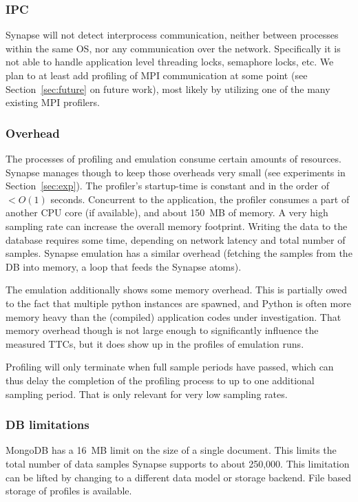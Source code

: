 \documentclass[10pt, conference, compsocconf]{IEEEtran}
\newcommand{\synapse}{Synapse\xspace}
\begin{document}
 \subsubsection{IPC}  \synapse will not detect interprocess
 communication, neither between processes within the same OS, nor any
 communication over the network.  Specifically it is not able to
 handle application level threading locks, semaphore locks, etc.  We
 plan to at least add profiling of MPI communication at some point (see
 Section~\ref{sec:future} on future work), most likely by utilizing
 one of the many existing MPI profilers.

 \subsubsection{Overhead}  The processes of profiling and emulation
 consume certain amounts of resources.  \synapse manages though to
 keep those overheads very small (see experiments in
 Section~\ref{sec:exp}).
 The profiler's startup-time is
 constant and in the order of $<O(1)$ seconds.  Concurrent to the
 application, the profiler consumes a part of another CPU core (if
 available), and about 150~MB of memory.  A very high sampling rate
 can increase the overall memory footprint.  Writing the data to
 the database requires some time, depending on network latency and
 total number of samples.
 \synapse emulation has a similar overhead (fetching the samples from
 the DB into memory, a loop that feeds the \synapse atoms).  

 The emulation additionally shows some memory overhead.  This is
 partially owed to the fact that multiple python instances are
 spawned, and Python is often more memory heavy than the (compiled)
 application codes under investigation.  That memory overhead though
 is not large enough to significantly influence the measured TTCs, but
 it does show up in the profiles of emulation runs.

 Profiling will only terminate when full sample periods have passed,
 which can thus delay the completion of the profiling process to up to
 one additional sampling period.  That is only relevant for very low
 sampling rates.

 \subsubsection{DB limitations}  MongoDB has a 16~MB limit on the size of
 a single document.  This limits the total number of data samples
 \synapse supports to about 250,000.  This limitation can be lifted by
 changing to a different data model or storage backend.  File based
 storage of profiles is available.
\end{document}
